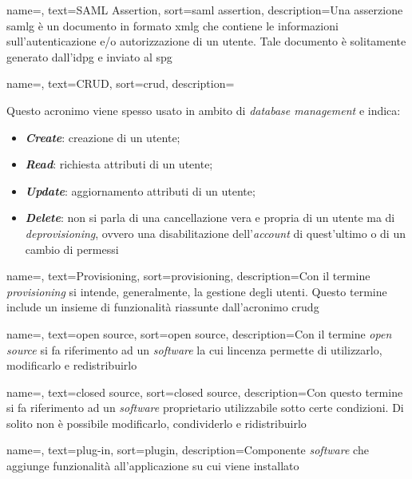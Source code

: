 {
    name=,
    text=SAML Assertion,
    sort=saml assertion,
    description={Una asserzione \gls{samlg} è un documento in formato \gls{xmlg} che contiene le informazioni sull'autenticazione e/o autorizzazione di un utente. Tale documento è solitamente generato dall'\gls{idpg} e inviato al \gls{spg}}
}

{
    name=,
    text=CRUD,
    sort=crud,
    description={Questo acronimo viene spesso usato in ambito di \textit{database management} e indica:
    \begin{itemize}
        \item \textit{\textbf{Create}}: creazione di un utente;
        \item \textit{\textbf{Read}}: richiesta attributi di un utente;
        \item \textit{\textbf{Update}}: aggiornamento attributi di un utente;
        \item \textit{\textbf{Delete}}: non si parla di una cancellazione vera e propria di un utente ma di \textit{deprovisioning}, ovvero una disabilitazione dell'\textit{account} di quest'ultimo o di un cambio di permessi
    \end{itemize}}
}

{
    name=,
    text=Provisioning,
    sort=provisioning,
    description={Con il termine \textit{provisioning} si intende, generalmente, la gestione degli utenti. Questo termine include un insieme di funzionalità riassunte dall'acronimo \gls{crudg}}
}

{
    name=,
    text=open source,
    sort=open source,
    description={Con il termine \textit{open source} si fa riferimento ad un \textit{software} la cui lincenza permette di utilizzarlo, modificarlo e redistribuirlo}
}

{
    name=,
    text=closed source,
    sort=closed source,
    description={Con questo termine si fa riferimento ad un \textit{software} proprietario utilizzabile sotto certe condizioni. Di solito non è possibile modificarlo, condividerlo e ridistribuirlo}
}

{
    name=,
    text=plug-in,
    sort=plugin,
    description={Componente \textit{software} che aggiunge funzionalità all'applicazione su cui viene installato}
}

